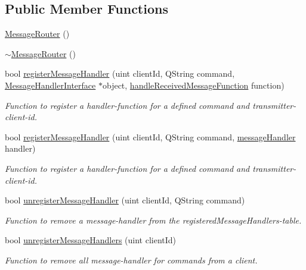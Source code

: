 \subsection*{Public Member Functions}
\begin{DoxyCompactItemize}
\item 
\hyperlink{class_server_appl_1_1_message_router_ae120c05ba781d09cc2f9dbad3207318f}{Message\+Router} ()
\item 
\hyperlink{class_server_appl_1_1_message_router_aa53a25f4f00d925f7eb17289db43f1a7}{$\sim$\+Message\+Router} ()
\item 
bool \hyperlink{class_server_appl_1_1_message_router_a579f5ac2024d4b7badcb64d2f8f81ff0}{register\+Message\+Handler} (uint client\+Id, Q\+String command, \hyperlink{class_server_appl_1_1_message_handler_interface}{Message\+Handler\+Interface} $\ast$object, \hyperlink{_message_router_8h_a7aaf0117cb85c9ee1867235806553ef4}{handle\+Received\+Message\+Function} function)
\begin{DoxyCompactList}\small\item\em Function to register a handler-\/function for a defined command and transmitter-\/client-\/id. \end{DoxyCompactList}\item 
bool \hyperlink{class_server_appl_1_1_message_router_a519dd3612a2679cb3ee41e02a831165c}{register\+Message\+Handler} (uint client\+Id, Q\+String command, \hyperlink{structmessage_handler}{message\+Handler} handler)
\begin{DoxyCompactList}\small\item\em Function to register a handler-\/function for a defined command and transmitter-\/client-\/id. \end{DoxyCompactList}\item 
bool \hyperlink{class_server_appl_1_1_message_router_a7fa02758e05c0432426cfe5ab4fbe592}{unregister\+Message\+Handler} (uint client\+Id, Q\+String command)
\begin{DoxyCompactList}\small\item\em Function to remove a message-\/handler from the registered\+Message\+Handlers-\/table. \end{DoxyCompactList}\item 
bool \hyperlink{class_server_appl_1_1_message_router_a08121b10588f0026c2d8b775deec1ef3}{unregister\+Message\+Handlers} (uint client\+Id)
\begin{DoxyCompactList}\small\item\em Function to remove all message-\/handler for commands from a client. \end{DoxyCompactList}\item 

\end{DoxyCompactItemize}
